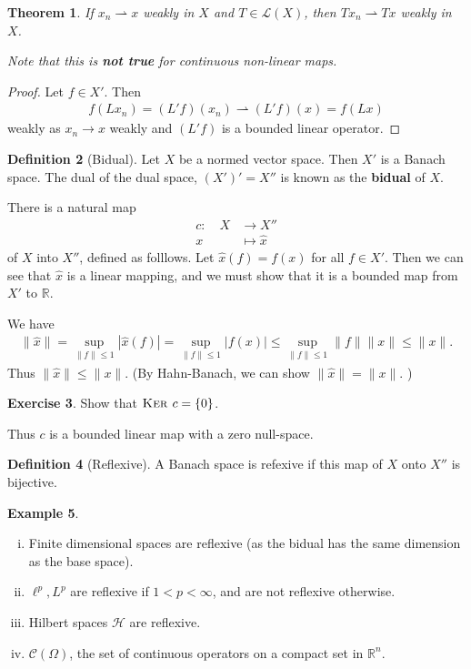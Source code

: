 \documentclass[10pt, oneside, reqno]{amsart}
\theoremstyle{plain}%
\newtheorem{thm}{Theorem}[section]
\numberwithin{equation}{section}
\theoremstyle{definition}
\newtheorem{defn}[thm]{Definition}
\newtheorem{exmp}[thm]{Example}
\newtheorem{exer}[thm]{Exercise}
\theoremstyle{remark}
\newcommand{\R}{\mathbb{R}}
\newcommand{\El}{\mathcal{L}}
\newcommand{\mapping}[5]{\begin{align*}
    #1 : \quad     #2 &\rightarrow #3 \\
            #4  &\mapsto #5
\end{align*}    
}
\renewcommand{\ker}{\textsc{Ker\ }}
\begin{document}
\begin{thm}
    If $x_n \rightharpoonup x$ weakly in $X$ and $T \in \El(X)$, then $Tx_n \rightharpoonup Tx$ weakly in $X$.  
    
    Note that this is \textbf{not true} for continuous non-linear maps. 
\end{thm}
\begin{proof}
    Let $f \in X'$.  Then \begin{align*}
        f(Lx_n) = (L'f)(x_n) \rightharpoonup (L'f)(x) = f(Lx)
    \end{align*} weakly as $x_n \rightarrow x$ weakly and $(L'f)$ is a bounded linear operator.  
\end{proof}


\begin{defn}[Bidual]
    Let $X$ be a normed vector space. Then $X'$ is a Banach space.  The dual of the dual space, $(X')' = X''$ is known as the \textbf{bidual} of $X$.  
\end{defn}


There is a natural map \mapping{c}{X}{X''}{x}{\hat x} of $X$ into $X''$, defined as folllows.  Let $\hat x(f) = f(x)$ for all $f \in X'$.  Then we can see that $\hat x$ is a linear mapping, and we must show that it is a bounded map from $X'$ to $\R$.  

We have \begin{align*}
    \| \hat x \| = \sup_{\| f \| \leq 1} |\hat x(f)| = \sup_{\| f \| \leq 1} |f(x)| \leq \sup_{\|f \| \leq 1} \| f \| \| x \| \leq \| x \|. 
\end{align*}  Thus $\| \hat x \| \leq \| x \|$.  (By Hahn-Banach, we can show $\| \hat x \| = \| x \|$. )

\begin{exer}
    Show that $\ker c = \{ 0 \}$.  
\end{exer}  

Thus $c$ is a bounded linear map with a zero null-space.

\begin{defn}[Reflexive]
    A Banach space is refexive if this map of $X$ onto $X''$ is bijective.  
\end{defn}

\begin{exmp}{\ }
    \begin{enumerate}[(i)]
        \item Finite dimensional spaces are reflexive (as the bidual has the same dimension as the base space).
        \item $\ell^p, L^p$ are reflexive if $1 < p < \infty$, and are not reflexive otherwise.
        \item Hilbert spaces $\mathcal H$ are reflexive.
        \item $\mathcal C(\Omega)$, the set of continuous operators on a compact set in $\R^n$.  
    \end{enumerate}
\end{exmp}
\end{document}
